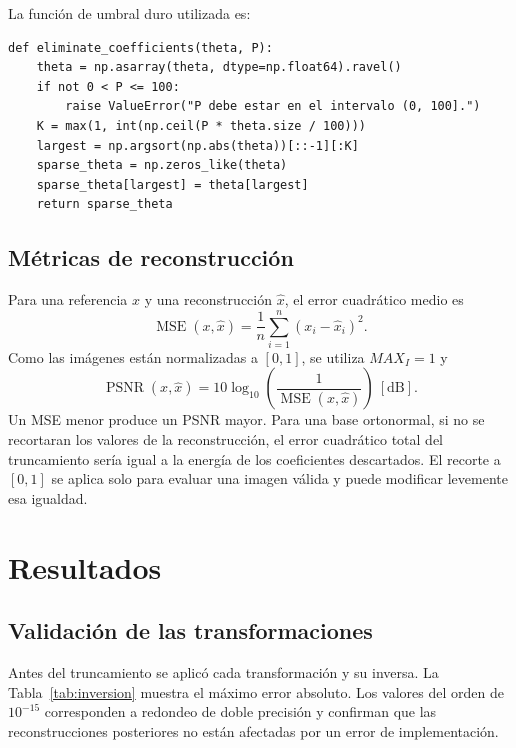 \documentclass[11pt,a4paper]{article}
\begin{document}
La función de umbral duro utilizada es:
\begin{lstlisting}[caption={Eliminación de los coeficientes de menor magnitud.},label={lst:threshold}]
def eliminate_coefficients(theta, P):
    theta = np.asarray(theta, dtype=np.float64).ravel()
    if not 0 < P <= 100:
        raise ValueError("P debe estar en el intervalo (0, 100].")
    K = max(1, int(np.ceil(P * theta.size / 100)))
    largest = np.argsort(np.abs(theta))[::-1][:K]
    sparse_theta = np.zeros_like(theta)
    sparse_theta[largest] = theta[largest]
    return sparse_theta
\end{lstlisting}

\subsection{Métricas de reconstrucción}

Para una referencia $x$ y una reconstrucción $\hat{x}$, el error cuadrático medio es
\begin{equation}
    \operatorname{MSE}(x,\hat{x})=\frac{1}{n}
    \sum_{i=1}^{n}(x_i-\hat{x}_i)^2.
    \label{eq:mse}
\end{equation}
Como las imágenes están normalizadas a $[0,1]$, se utiliza $MAX_I=1$ y
\begin{equation}
    \operatorname{PSNR}(x,\hat{x})=10\log_{10}\left(
    \frac{1}{\operatorname{MSE}(x,\hat{x})}\right)\ [\mathrm{dB}].
    \label{eq:psnr}
\end{equation}
Un MSE menor produce un PSNR mayor. Para una base ortonormal, si no se recortaran los valores de la reconstrucción, el error cuadrático total del truncamiento sería igual a la energía de los coeficientes descartados. El recorte a $[0,1]$ se aplica solo para evaluar una imagen válida y puede modificar levemente esa igualdad.

\section{Resultados}

\subsection{Validación de las transformaciones}

Antes del truncamiento se aplicó cada transformación y su inversa. La Tabla~\ref{tab:inversion} muestra el máximo error absoluto. Los valores del orden de $10^{-15}$ corresponden a redondeo de doble precisión y confirman que las reconstrucciones posteriores no están afectadas por un error de implementación.
\end{document}
